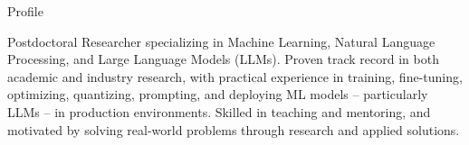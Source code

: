 


\begin{rubric}{Profile}
\begin{minipage}{\textwidth}
Postdoctoral Researcher specializing in Machine Learning, Natural Language Processing, and Large Language Models (LLMs). Proven track record in both academic and industry research, with practical experience in training, fine-tuning, optimizing, quantizing, prompting, and deploying ML models -- particularly LLMs -- in production environments. Skilled in teaching and mentoring, and motivated by solving real-world problems through research and applied solutions.
\end{minipage}
\end{rubric}